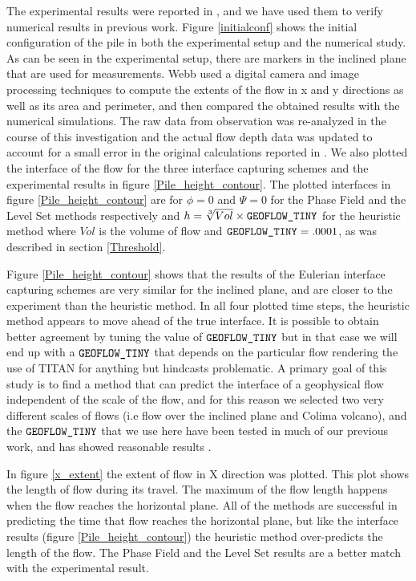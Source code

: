 \documentclass[review]{elsarticle}
\begin{document}
The experimental results were reported in \cite{AmyWebb2004}, and we have used them to verify   numerical results  in previous work. 
Figure \ref{initialconf} shows the initial configuration of the pile in both the experimental setup and the numerical study. As can be seen in the experimental setup, 
there are markers in the inclined plane that are used for measurements. Webb \cite{AmyWebb2004}
  used a digital camera and image processing techniques to compute the extents of the flow in 
x and y directions as well as its area and perimeter, and then compared the obtained results with the numerical simulations.%
The raw data from observation was re-analyzed in the course of this investigation and the actual flow depth data was updated to account for a small error in the original calculations
reported in \cite{AmyWebb2004}.
We also plotted 
the interface of the flow for the three interface capturing schemes and the experimental results in figure \ref{Pile_height_contour}.
The plotted interfaces in figure \ref{Pile_height_contour} are for $\phi=0$ and $\varPsi=0$ for the Phase Field and the Level Set methods respectively 
and $h=\sqrt[3]{Vol} \times {\rm\verb1GEOFLOW_TINY1}  $ for the heuristic method where $Vol$ is the volume of flow and ${\rm\verb1GEOFLOW_TINY1} = .0001$, as was described in section \ref{Threshold}.

Figure \ref{Pile_height_contour} shows that the results of the Eulerian interface capturing schemes are very similar for the inclined plane, 
and are closer to the experiment than the heuristic method. In all four plotted time steps, the heuristic method appears to move ahead of the true  interface. 
It is possible to obtain better agreement by tuning the value of  ${\rm\verb1GEOFLOW_TINY1}  $  but in that case we will end up with a  ${\rm\verb1GEOFLOW_TINY1}$ that
 depends on the particular flow rendering the use of TITAN for anything but hindcasts problematic. 
A primary goal of  this study is to find a method that can predict the interface of a geophysical flow independent of the scale of the flow, 
and for this reason we selected two very different scales of flows (i.e flow over the inclined plane and Colima volcano), 
and the ${\rm\verb1GEOFLOW_TINY1} $ that we use here have been tested in much of our previous work, and has showed reasonable results \cite{Patra2005,Patra2006}. 

In figure \ref{x_extent} the extent of flow in X direction was plotted. This plot shows the length of flow during its travel. 
The maximum of the flow length happens when the flow reaches the horizontal plane. All of the methods are successful in predicting the time 
that flow reaches the horizontal plane, but like the interface results (figure \ref{Pile_height_contour}) the heuristic method over-predicts the length of the flow.
The Phase Field and the Level Set results are a better match with the experimental result.
\end{document}
